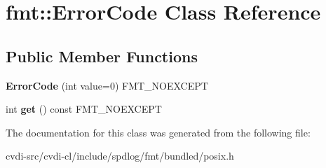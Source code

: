 \hypertarget{classfmt_1_1ErrorCode}{}\section{fmt\+:\+:Error\+Code Class Reference}
\label{classfmt_1_1ErrorCode}
\subsection*{Public Member Functions}
\begin{DoxyCompactItemize}
\item 
{\bfseries Error\+Code} (int value=0) F\+M\+T\+\_\+\+N\+O\+E\+X\+C\+E\+PT\hypertarget{classfmt_1_1ErrorCode_ad00ec32ba4e9a9591e856653b4d682be}{}\label{classfmt_1_1ErrorCode_ad00ec32ba4e9a9591e856653b4d682be}

\item 
int {\bfseries get} () const F\+M\+T\+\_\+\+N\+O\+E\+X\+C\+E\+PT\hypertarget{classfmt_1_1ErrorCode_a2536abb622de047cd5be707df1df7493}{}\label{classfmt_1_1ErrorCode_a2536abb622de047cd5be707df1df7493}

\end{DoxyCompactItemize}


The documentation for this class was generated from the following file\+:\begin{DoxyCompactItemize}
\item 
cvdi-\/src/cvdi-\/cl/include/spdlog/fmt/bundled/posix.\+h\end{DoxyCompactItemize}
